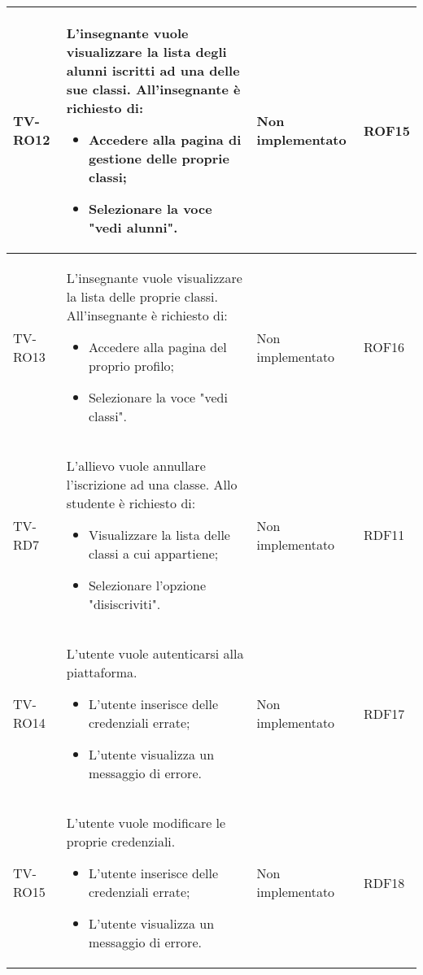 \begin{longtable}{|>{\centering\arraybackslash}m{1.6cm}|>{\centering\arraybackslash}m{6.41cm}|>{\centering\arraybackslash}m{3.1cm} | >{\centering\arraybackslash}m{2.6cm}|}
		TV-RO12 & L'insegnante vuole visualizzare la lista degli alunni iscritti ad una delle sue classi. All'insegnante è richiesto di:
		\begin{itemize}
			\item Accedere alla pagina di gestione delle proprie classi;
			\item Selezionare la voce "vedi alunni".		
		\end{itemize}& Non implementato  & ROF15 \\ \hline
		
		  \rowcolor{LightGray}
		TV-RO13 & L'insegnante vuole visualizzare la lista delle proprie classi. All'insegnante è richiesto di:
		\begin{itemize}
			\item Accedere alla pagina del proprio profilo;
			\item Selezionare la voce "vedi classi".		
		\end{itemize} & Non implementato & ROF16 \\ \hline
		
		TV-RD7 & L'allievo vuole annullare l'iscrizione ad una classe. Allo studente è richiesto di:
		\begin{itemize}
			\item Visualizzare la lista delle classi a cui appartiene;
			\item Selezionare l'opzione "disiscriviti".		
		\end{itemize}& Non implementato  & RDF11 \\ \hline
		
		  \rowcolor{LightGray}
		TV-RO14 & L'utente vuole autenticarsi alla piattaforma. 
		\begin{itemize}
			\item L'utente inserisce delle credenziali errate;
			\item L'utente visualizza un messaggio di errore.
		\end{itemize} & Non implementato & RDF17 \\ \hline
		
		TV-RO15 & L'utente vuole modificare le proprie credenziali. 
		\begin{itemize}
			\item L'utente inserisce delle credenziali errate;
			\item L'utente visualizza un messaggio di errore.
		\end{itemize} & Non implementato & RDF18 \\ \hline
		

\end{longtable}
